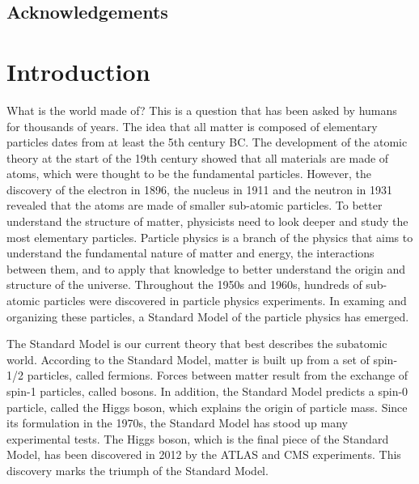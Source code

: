 \documentclass[12pt,oneside,letterpaper]{memoir}
\begin{document}
\frontmatter

\thetitlepage
\copyrightpage

\section*{Acknowledgements}


\newpage
\tableofcontents
\listoftables
\listoffigures

\mainmatter

\chapter{Introduction}
What is the world made of? This is a question that has been asked by humans for thousands of years. 
The idea that all matter is composed of elementary particles dates from at least the 5th century BC. 
The development of the atomic theory at the start of the 19th century showed that all materials are 
made of atoms, which were thought to be the fundamental particles. However, the discovery of the electron 
in 1896, the nucleus in 1911 and the neutron in 1931 revealed that the atoms are made of smaller sub-atomic particles. 
To better understand the structure of matter, physicists need to look deeper and study the most elementary particles. 
Particle physics is a branch of the physics that aims to understand the fundamental nature of matter and energy, 
the interactions between them, and to apply that knowledge to better understand the origin and structure of the universe. 
Throughout the 1950s and 1960s, hundreds of sub-atomic particles were discovered in particle physics experiments.
In examing and organizing these particles, a Standard Model of the particle physics has emerged.

The Standard Model is our current theory that best describes the subatomic world. 
According to the Standard Model, matter is built up from a set of spin-1/2 particles, called fermions. 
Forces between matter result from the exchange of spin-1 particles, called bosons. 
In addition, the Standard Model predicts a spin-0 particle, called the Higgs boson, which explains the origin of particle mass. 
Since its formulation in the 1970s, the Standard Model has stood up many experimental tests. 
The Higgs boson, which is the final piece of the Standard Model, has been discovered in 2012 by the ATLAS and CMS experiments. 
This discovery marks the triumph of the Standard Model. 
\end{document}
